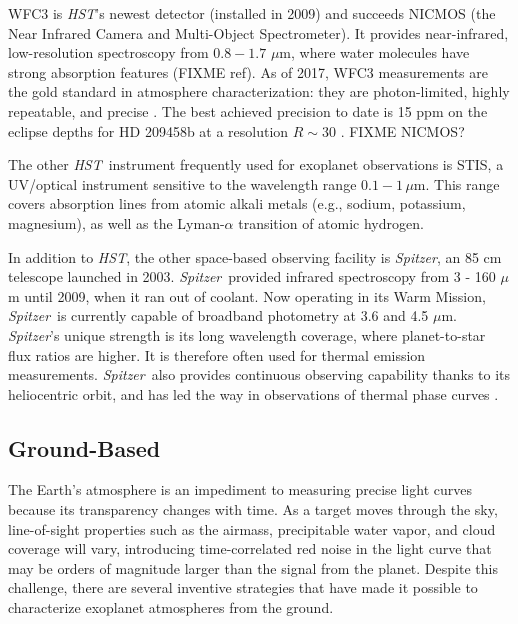\documentclass[graybox,natbib,nosecnum]{svmult}
\newcommand{\project}[1]{\textsl{#1}}
\newcommand{\HST}{\project{HST}}
\newcommand{\Spitzer}{\project{Spitzer}}
\begin{document}
WFC3 is \HST's newest detector (installed in 2009) and succeeds NICMOS (the Near Infrared Camera and Multi-Object Spectrometer). It provides near-infrared, low-resolution spectroscopy from $0.8 - 1.7$ $\mu$m, where water molecules have strong absorption features (FIXME ref).  As of 2017, WFC3 measurements are the gold standard in atmosphere characterization: they are photon-limited, highly repeatable, and precise \citep[e.g.][]{deming13, kreidberg14a}. The best achieved precision to date is 15 ppm on the eclipse depths for HD 209458b at a resolution $R\sim 30$ \citep{line16}. FIXME NICMOS?

The other \HST\ instrument frequently used for exoplanet observations is STIS, a UV/optical instrument sensitive to the wavelength range $0.1 - 1 \, \mu$m. This range covers absorption lines from atomic alkali metals (e.g., sodium, potassium, magnesium), as well as the Lyman-$\alpha$ transition of atomic hydrogen. 


In addition to \HST, the other space-based observing facility is \Spitzer, an 85 cm telescope launched in 2003. \Spitzer\ provided infrared spectroscopy from 3 - 160 $\mu$m until 2009, when it ran out of coolant. Now operating in its Warm Mission, \Spitzer\ is currently capable of broadband photometry at 3.6 and 4.5 $\mu$m.  \Spitzer's unique strength is its long wavelength coverage, where planet-to-star flux ratios are higher. It is therefore often used for thermal emission measurements. \Spitzer\ also provides continuous observing capability thanks to its heliocentric orbit, and has led the way in observations of thermal phase curves \citep[e.g.][]{knutson07}. 


\subsection{Ground-Based}
The Earth's atmosphere is an impediment to measuring precise light curves because its transparency changes with time.  As a target moves through the sky, line-of-sight properties such as the airmass, precipitable water vapor, and cloud coverage will vary, introducing time-correlated red noise in the light curve that may be orders of magnitude larger than the signal from the planet. Despite this challenge, there are several inventive strategies that have made it possible to characterize exoplanet atmospheres from the ground. 
\end{document}
